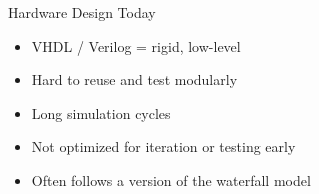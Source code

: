 %
%
%

\begin{frame}{Hardware Design Today}
\begin{itemize}
    \item VHDL / Verilog = rigid, low-level
    \item Hard to reuse and test modularly
    \item Long simulation cycles
    \item Not optimized for iteration or testing early
    \item Often follows a version of the waterfall model
\end{itemize}
\end{frame}

